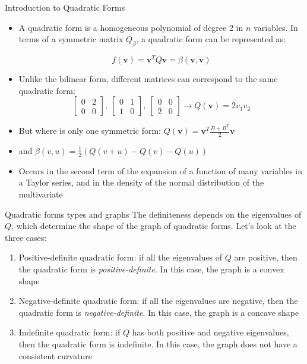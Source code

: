 \documentclass[fullscreen=true, bookmarks=true, hyperref={pdfencoding=unicode}]{beamer}
\begin{document}
\begin{frame}{Introduction to Quadratic Forms}
  \begin{itemize}
  \item A quadratic form is a homogeneous polynomial of degree 2 in $n$ variables. 
  In terms of a symmetric matrix $Q_\beta$, a quadratic form can be represented as:
  
  \[
  f(\mathbf{v}) = \mathbf{v}^T Q \mathbf{v} = \beta(\mathbf{v}, \mathbf{v})
  \]

  \pause
  \item Unlike the bilinear form, different matrices can correspond 
  to the same quadratic form:
  $$\begin{bmatrix}
    0 & 2 \\ 0 & 0
  \end{bmatrix},\ 
  \begin{bmatrix}
    0 & 1 \\ 1 & 0
  \end{bmatrix},\ 
  \begin{bmatrix}
    0 & 0 \\ 2 & 0
  \end{bmatrix} \to Q(\mathbf{v}) = 2v_1v_2$$
  
  \pause
  \item But where is only one symmetric form: $Q(\mathbf{v}) = \mathbf{v}^T \frac{B+B^T}{2} \mathbf{v}$
  \item and $\beta(v, u) = \frac{1}{2}(Q(v+u) - Q(v) - Q(u))$

  \pause
  \item Occurs in the second term of the expansion 
  of a function of many variables in a Taylor series, and 
  in the density of the normal distribution of the multivariate
\end{itemize}
\end{frame}

\begin{frame}{Quadratic forms types and graphs}
  The definiteness depends on the eigenvalues of $Q$, which determine 
  the shape of the graph of quadratic forms. Let's look at the three cases:
  
  \begin{enumerate}
    \pause\item Positive-definite quadratic form: if all the eigenvalues of $Q$ 
    are positive, then the quadratic form is \emph{positive-definite}. 
    In this case, the graph is a convex shape
  
    \pause\item Negative-definite quadratic form: if all the eigenvalues 
    are negative, then the quadratic form is \emph{negative-definite}. 
    In this case, the graph is a concave shape
    
    \pause\item Indefinite quadratic form: if $Q$ has both 
    positive and negative eigenvalues, 
    then the quadratic form is indefinite. 
    In this case, the graph does not have a consistent curvature
  \end{enumerate}
\end{frame}
\end{document}
